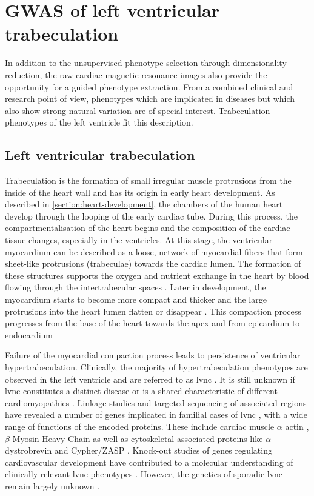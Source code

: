 \chapter{GWAS of left ventricular trabeculation}
\label{chapter:GWAS-FD}
In addition to the unsupervised phenotype selection through dimensionality reduction, the raw cardiac magnetic resonance images also provide the opportunity for a guided phenotype extraction. From a combined clinical and research point of view, phenotypes which are implicated in diseases but which also show strong natural variation are of special interest. Trabeculation phenotypes of the left ventricle fit this description.

\section{Left ventricular trabeculation}
\label{section:intro-FD}
Trabeculation is the formation of small irregular muscle protrusions from the inside of the heart wall and has its origin in early heart development. As described in \cref{section:heart-development}, the chambers of the human heart develop through the looping of the early cardiac tube. During this process, the compartmentalisation of the heart begins and the composition of the cardiac tissue changes, especially in the ventricles. At this stage, the ventricular myocardium can be described as a loose,  network of myocardial fibers that form sheet-like protrusions (trabeculae) towards the cardiac lumen. The formation of these structures supports the oxygen and nutrient exchange in the heart \citep{Chen2009} by blood flowing through the intertrabecular spaces \citep{Zambrano2002}. Later in development, the myocardium starts to become more compact and thicker and the large protrusions into the heart lumen flatten or disappear \citep{Yousef2009}. This compaction process progresses from the base of the heart towards the apex and from epicardium to endocardium \citep{Zambrano2002}

Failure of the myocardial compaction process leads to persistence of ventricular hypertrabeculation. Clinically, the majority of hypertrabeculation phenotypes are observed in the left ventricle and are referred to as \gls{lvnc} \citep{Zambrano2002}. It is still unknown if \gls{lvnc} constitutes a distinct disease or is a shared characteristic of different cardiomyopathies \citep{Captur2013}. Linkage studies and targeted sequencing of associated regions have revealed a number of genes implicated in familial cases of \gls{lvnc} \citep{Bleyl1997,Klaassen2008,Moric-Janiszewska2008}, with a wide range of functions of the encoded proteins. These include cardiac muscle \(\alpha\) actin \citep{Monserrat2007}, 
\(\beta\)-Myosin Heavy Chain \citep{Budde2007} as well as cytoskeletal-associated proteins like \(\alpha\)-dystrobrevin \citep{Ichida2001} and Cypher/ZASP \citep{Vatta2003}. Knock-out studies of genes regulating cardiovascular development have contributed to a molecular understanding of clinically relevant \gls{lvnc} phenotypes \citep{Chen2009,Mysliwiec2011}. However, the genetics of sporadic \gls{lvnc} remain largely unknown \citep{Zambrano2002}.

